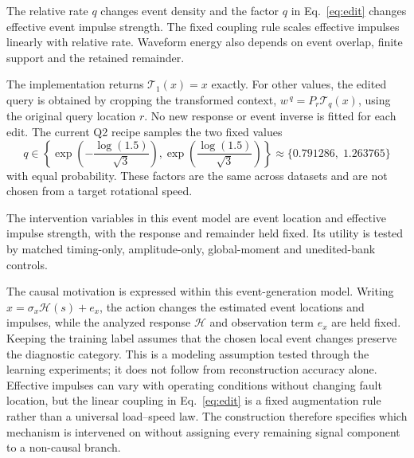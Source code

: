 The relative rate $q$ changes event density and the factor $q$ in
Eq.~\eqref{eq:edit} changes effective event impulse strength. The fixed
coupling rule scales effective impulses linearly with relative rate.
Waveform energy also depends on event overlap, finite support and the
retained remainder.

The implementation returns $\mathcal T_1(x)=x$ exactly. For other values,
the edited query is obtained by cropping the transformed context,
$w^{\,q}=P_r\mathcal T_q(x)$, using the original query location $r$.
No new response or event inverse is fitted for each edit. The current
Q2 recipe samples the two fixed values
\begin{equation}
 q\in\left\{\exp\!\left(-\frac{\log(1.5)}{\sqrt3}\right),
                 \exp\!\left(\frac{\log(1.5)}{\sqrt3}\right)\right\}
       \approx\{0.791286,\;1.263765\}
 \label{eq:q}
\end{equation}
with equal probability. These factors are the same across datasets and are
not chosen from a target rotational speed.

The intervention variables in this event model are event location and
effective impulse strength, with the response and remainder held fixed.
Its utility is tested by matched timing-only, amplitude-only,
global-moment and unedited-bank controls.

The causal motivation is expressed within this event-generation model.
Writing $x=\sigma_x\mathcal H(s)+e_x$, the action changes the estimated
event locations and impulses, while the analyzed response $\mathcal H$ and
observation term $e_x$ are held fixed. Keeping the training label assumes that
the chosen local event changes preserve the diagnostic category. This is a
modeling assumption tested through the learning experiments; it does not follow
from reconstruction accuracy alone. Effective impulses can vary with operating
conditions without changing fault location, but the linear coupling in
Eq.~\eqref{eq:edit} is a fixed augmentation rule rather than a universal
load--speed law. The construction therefore specifies which mechanism is
intervened on without assigning every remaining signal component to a
non-causal branch.

